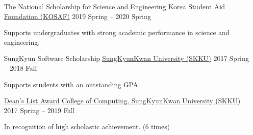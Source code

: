\documentclass[11pt, a4paper]{cv}
\begin{document}
\begin{cventries}

  \cvhonor
    {\href{https://www.kosaf.go.kr/eng/jsp/aid/aid02_01_01.jsp}{The National Scholarship for Science and Engineering}} %
    {\href{https://www.kosaf.go.kr/eng/jsp/main.jsp}{Korea Student Aid Foundation (KOSAF)}} %
    {2019 Spring -- 2020 Spring} %
    {
      \begin{cvitems} %
        \item {Supports undergraduates with strong academic performance in science and engineering.}
      \end{cvitems}
    }

  \cvhonor
    {SungKyun Software Scholarship} %
    {\href{https://www.skku.edu/eng/}{SungKyunKwan University (SKKU)}} %
    {2017 Spring -- 2018 Fall} %
    {
      \begin{cvitems} %
        \item {Supports students with an outstanding GPA.}
      \end{cvitems}
    }

  \cvhonor
    {\href{https://cs.skku.edu/en/edures/education/view/4137}{Dean's List Award}} %
    {\href{https://cs.skku.edu/en}{College of Computing, SungKyunKwan University (SKKU)}} %
    {2017 Spring -- 2019 Fall} %
    {
      \begin{cvitems} %
        \item {In recognition of high scholastic achievement. (6 times)}
      \end{cvitems}
    }

\end{cventries}
\end{document}
